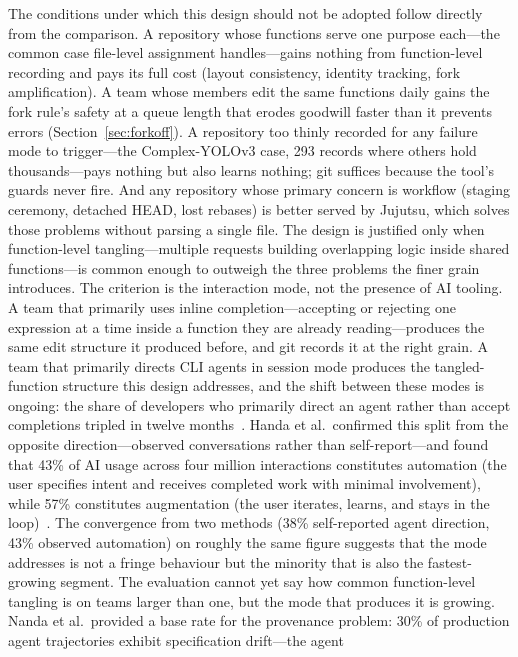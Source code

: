 The conditions under which this design should not be adopted follow directly from
the comparison.  A repository whose functions serve one purpose each---the common
case file-level assignment handles---gains nothing from function-level recording
and pays its full cost (layout consistency, identity tracking, fork
amplification).  A team whose members edit the same functions daily gains the
fork rule's safety at a queue length that erodes goodwill faster than it prevents
errors (Section~\ref{sec:forkoff}).  A repository too thinly recorded for any
failure mode to trigger---the Complex-YOLOv3 case, 293 records where others hold
thousands---pays nothing but also learns nothing; git suffices because the tool's
guards never fire.  And any repository whose primary concern is workflow
(staging ceremony, detached HEAD, lost rebases) is better served by Jujutsu,
which solves those problems without parsing a single file.  The design is
justified only when function-level tangling---multiple requests building
overlapping logic inside shared functions---is common enough to outweigh the
three problems the finer grain introduces.  The criterion is the interaction
mode, not the presence of AI tooling.  A team that primarily uses inline
completion---accepting or rejecting one expression at a time inside a function
they are already reading---produces the same edit structure it produced before,
and git records it at the right grain.  A team that primarily directs CLI agents
in session mode produces the tangled-function structure this design addresses,
and the shift between these modes is ongoing: the share of developers who
primarily direct an agent rather than accept completions tripled in twelve
months~\cite{stackoverflow2025}.  Handa et al.\ confirmed this split from the
opposite direction---observed conversations rather than self-report---and found
that 43\% of AI usage across four million interactions constitutes automation
(the user specifies intent and receives completed work with minimal
involvement), while 57\% constitutes augmentation (the user iterates, learns,
and stays in the loop)~\cite{handa2025tasks}. The convergence from two methods
(38\% self-reported agent direction, 43\% observed automation) on roughly the
same figure suggests that the mode \sgt{} addresses is not a fringe behaviour
but the minority that is also the fastest-growing segment.  The evaluation
cannot yet say how common function-level tangling is on teams larger than one,
but the mode that produces it is growing. Nanda et al.\ provided a base rate for the provenance problem:
30\% of production agent trajectories exhibit specification drift---the agent
